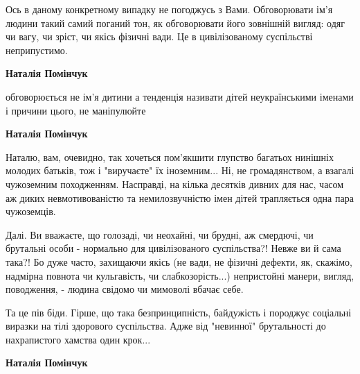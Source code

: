 \begin{itemize}
Ось в даному конкретному випадку не погоджусь з Вами. Обговорювати ім'я людини
такий самий поганий тон, як обговорювати його зовнішній вигляд: одяг чи вагу,
чи зріст, чи якісь фізичні вади. Це в цивілізованому суспільстві неприпустимо.

\begin{itemize}
 
\textbf{Наталія Помінчук} 

обговорюється не ім'я дитини а тенденція називати дітей неукраїнськими іменами
і причини цього, не маніпулюйте


 
\textbf{Наталія Помінчук} 

Наталю, вам, очевидно, так хочеться пом'якшити глупство багатьох нинішніх
молодих батьків, тож і "виручаєте" їх іноземним... Ні, не громадянством, а
взагалі чужоземним походженням. Насправді, на кілька десятків дивних для нас,
часом аж диких невмотивованістю та немилозвучністю імен дітей трапляється одна
пара чужоземців.

Далі. Ви вважаєте, що голозаді, чи неохайні, чи брудні, аж смердючі, чи
брутальні особи - нормально для цивілізованого суспільства?! Невже ви й сама
така?! Бо дуже часто, захищаючи якісь (не вади, не фізичні дефекти, як,
скажімо, надмірна повнота чи кульгавість, чи слабкозорість...) непристойні
манери, вигляд, поводження, - людина свідомо чи мимоволі вбачає себе.

Та це пів біди. Гірше, що така безпринципність, байдужість і породжує соціальні
виразки на тілі здорового суспільства. Адже від "невинної" брутальності до
нахрапистого хамства один крок...

 
\textbf{Наталія Помінчук} 


\end{itemize}
\end{itemize}
